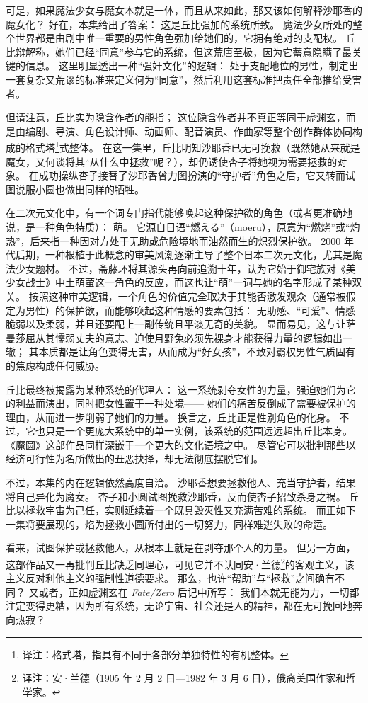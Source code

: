 可是，如果魔法少女与魔女本就是一体，而且从来如此，那又该如何解释沙耶香的魔女化？
好在，本集给出了答案：
这是丘比强加的系统所致。
魔法少女所处的整个世界都是由剧中唯一重要的男性角色强加给她们的，它拥有绝对的支配权。
丘比辩解称，她们已经“同意”参与它的系统，但这荒唐至极，因为它蓄意隐瞒了最关键的信息。
这里明显透出一种“强奸文化”的逻辑：
处于支配地位的男性，制定出一套复杂又荒谬的标准来定义何为“同意”，然后利用这套标准把责任全部推给受害者。

但请注意，丘比实为隐含作者的能指；
这位隐含作者并不真正等同于虚渊玄，而是由编剧、导演、角色设计师、动画师、配音演员、作曲家等整个创作群体协同构成的格式塔\footnote{%
    译注：格式塔，指具有不同于各部分单独特性的有机整体。
}式整体。
在这一集里，丘比明知沙耶香已无可挽救（既然她从来就是魔女，又何谈将其“从什么中拯救”呢？），却仍诱使杏子将她视为需要拯救的对象。
在成功操纵杏子接替了沙耶香曾力图扮演的“守护者”角色之后，它又转而试图说服小圆也做出同样的牺牲。

在二次元文化中，有一个词专门指代能够唤起这种保护欲的角色（或者更准确地说，是一种角色特质）：
萌。
它源自日语“燃える”（moeru），原意为“燃烧”或“灼热”，后来指一种因对方处于无助或危险境地而油然而生的炽烈保护欲。
2000 年代后期，一种根植于此概念的审美风潮逐渐主导了整个日本二次元文化，尤其是魔法少女题材。
不过，斋藤环将其源头再向前追溯十年，认为它始于御宅族对《美少女战士》中土萌萤这一角色的反应，而这也让“萌”一词与她的名字形成了某种双关。
按照这种审美逻辑，一个角色的价值完全取决于其能否激发观众（通常被假定为男性）的保护欲，而能够唤起这种情感的要素包括：
无助感、“可爱”、情感脆弱以及柔弱，并且还要配上一副传统且平淡无奇的美貌\cite{ref60}。
显而易见，这与让萨曼莎屈从其懦弱丈夫的意志、迫使月野兔必须先裸身才能获得力量的逻辑如出一辙；
其本质都是让角色变得无害，从而成为“好女孩”，不致对霸权男性气质固有的焦虑构成任何威胁。

丘比最终被揭露为某种系统的代理人：
这一系统剥夺女性的力量，强迫她们为它的利益而演出，同时把女性置于一种处境——
她们的痛苦反倒成了需要被保护的理由，从而进一步削弱了她们的力量。
换言之，丘比正是性别角色的化身。
不过，它也只是一个更庞大系统中的单一实例，该系统的范围远远超出丘比本身。
《魔圆》这部作品同样深嵌于一个更大的文化语境之中。
尽管它可以批判那些以经济可行性为名所做出的丑恶抉择，却无法彻底摆脱它们。

不过，本集的内在逻辑依然高度自洽。
沙耶香想要拯救他人、充当守护者，结果将自己异化为魔女。
杏子和小圆试图挽救沙耶香，反而使杏子招致杀身之祸。
丘比以拯救宇宙为己任，实则延续着一个既具毁灭性又充满苦难的系统。
而正如下一集将要展现的，焰为拯救小圆所付出的一切努力，同样难逃失败的命运。

看来，试图保护或拯救他人，从根本上就是在剥夺那个人的力量。
但另一方面，这部作品又一再批判丘比缺乏同理心，可见它并不认同安·兰德\footnote{%
    译注：安·兰德（1905 年 2 月 2 日—1982 年 3 月 6 日），俄裔美国作家和哲学家。
}的客观主义，该主义反对利他主义的强制性道德要求\cite{ref61}。
那么，也许“帮助”与“拯救”之间确有不同？
又或者，正如虚渊玄在 \emph{Fate/Zero} 后记中所写：
我们本就无能为力，一切都注定变得更糟，因为所有系统，无论宇宙、社会还是人的精神，都在无可挽回地奔向热寂\cite{ref29}？
